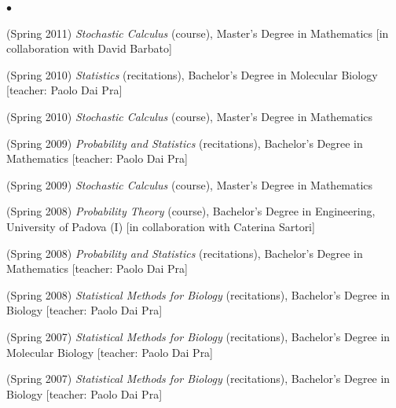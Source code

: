 \documentclass[a4paper,11pt,oneside]{amsart}
\newenvironment{myitemize}{%
\begin{list}{$\bullet$}%
 	{%
	\setlength{\itemsep}{0.3em}%
	\setlength{\topsep}{0.3em}%
	\setlength{\partopsep}{0em}%
	\setlength{\parsep}{0em}%
	\setlength{\parskip}{0em}%
	\setlength\leftmargin{1.5em}%
	\setlength\labelwidth{1.1em}%
	\setlength{\labelsep}{0.4em}%
	}%
	}%
{\end{list}}
\renewenvironment{itemize}{
\begin{myitemize}}%
{\end{myitemize}}
\begin{document}
\begin{itemize}
\item (Spring 2011)
\emph{Stochastic Calculus} (course),
Master's Degree in Mathematics
[in collaboration with David Barbato]


\item (Spring 2010)
\emph{Statistics} (recitations),
Bachelor's Degree in Molecular Biology
[teacher: Paolo Dai Pra]

\item (Spring 2010)
\emph{Stochastic Calculus} (course),
Master's Degree in Mathematics

\item (Spring 2009)
\emph{Probability and Statistics} (recitations),
Bachelor's Degree in Mathematics
[teacher: Paolo Dai Pra]

\item (Spring 2009)
\emph{Stochastic Calculus} (course),
Master's Degree in Mathematics

\item (Spring 2008)
\emph{Probability Theory} (course),
Bachelor's Degree in Engineering, 
University of Padova (I) [in collaboration with Caterina Sartori]

\item (Spring 2008)
\emph{Probability and Statistics} (recitations),
Bachelor's Degree in Mathematics
[teacher: Paolo Dai Pra]

\item (Spring 2008)
\emph{Statistical Methods for Biology} (recitations),
Bachelor's Degree in Biology
[teacher: Paolo Dai Pra]

\item (Spring 2007)
\emph{Statistical Methods for Biology} (recitations),
Bachelor's Degree in Molecular Biology
[teacher: Paolo Dai Pra]

\item (Spring 2007)
\emph{Statistical Methods for Biology} (recitations),
Bachelor's Degree in Biology
[teacher: Paolo Dai Pra]
\end{itemize}

\end{document}
